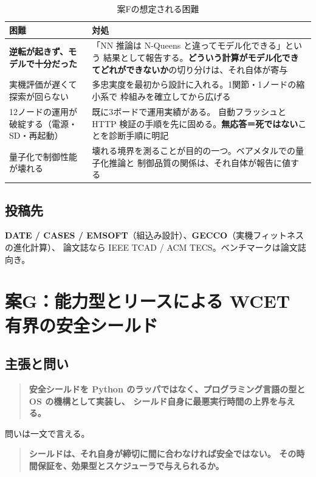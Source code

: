 \documentclass[11pt,a4paper]{article}
\newcommand{\prob}[1]{\textbf{\textcolor{red!55!black}{#1}}}
\newcommand{\keyp}[1]{\textbf{\textcolor{blue!45!black}{#1}}}
\begin{document}
\begin{table}[htbp]
\centering
\small
\caption{案Fの想定される困難}
\begin{tabularx}{\textwidth}{@{}X X@{}}
\toprule
\textbf{困難} & \textbf{対処} \\
\midrule
\prob{逆転が起きず、モデルで十分だった} & 「NN 推論は N-Queens と違ってモデル化できる」という
  結果として報告する。\keyp{どういう計算がモデル化できてどれができないか}の切り分けは、それ自体が寄与 \\
実機評価が遅くて探索が回らない & 多忠実度を最初から設計に入れる。1関節・1ノードの縮小系で
  枠組みを確立してから広げる \\
12ノードの運用が破綻する（電源・SD・再起動） & 既に3ボードで運用実績がある。
  自動フラッシュと HTTP 検証の手順を先に固める。\prob{無応答＝死ではない}ことを診断手順に明記 \\
量子化で制御性能が壊れる & 壊れる境界を測ることが目的の一つ。ベアメタルでの量子化推論と
  制御品質の関係は、それ自体が報告に値する \\
\bottomrule
\end{tabularx}
\end{table}

\subsection{投稿先}

\keyp{DATE / CASES / EMSOFT}（組込み設計）、\keyp{GECCO}（実機フィットネスの進化計算）、
論文誌なら IEEE TCAD / ACM TECS。ベンチマークは論文誌向き。

\section{案G：能力型とリースによる WCET 有界の安全シールド}
\label{sec:planG}

\subsection{主張と問い}

\begin{quote}
\keyp{安全シールドを Python のラッパではなく、プログラミング言語の型と OS の機構として実装し、
シールド自身に最悪実行時間の上界を与える。}
\end{quote}

\noindent
問いは一文で言える。

\begin{quote}
\keyp{シールドは、それ自身が締切に間に合わなければ安全ではない。
その時間保証を、効果型とスケジューラで与えられるか。}
\end{quote}
\end{document}
